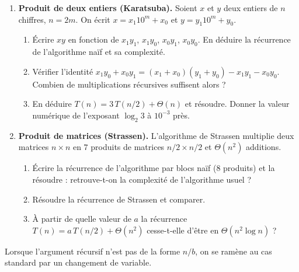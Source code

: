 \documentclass[11pt,a4paper]{article}
\begin{document}
\begin{enumerate}[label=\arabic*.,leftmargin=*]
  \item \textbf{Produit de deux entiers (Karatsuba).} Soient $x$ et $y$ deux entiers de
        $n$ chiffres, $n=2m$. On écrit $x = x_1 10^{m} + x_0$ et $y = y_1 10^{m}+y_0$.
        \begin{enumerate}[label=(\alph*)]
          \item Écrire $xy$ en fonction de $x_1y_1$, $x_1y_0$, $x_0y_1$, $x_0y_0$.
                En déduire la récurrence de l'algorithme naïf et sa complexité.
          \item Vérifier l'identité
                $x_1y_0 + x_0y_1 = (x_1+x_0)(y_1+y_0) - x_1y_1 - x_0y_0$.
                Combien de multiplications récursives suffisent alors ?
          \item En déduire $T(n) = 3\,T(n/2) + \Theta(n)$ et résoudre. Donner la valeur
                numérique de l'exposant $\log_2 3$ à $10^{-3}$ près.
        \end{enumerate}
  \item \textbf{Produit de matrices (Strassen).} L'algorithme de Strassen multiplie deux
        matrices $n\times n$ en $7$ produits de matrices $n/2 \times n/2$ et
        $\Theta(n^2)$ additions.
        \begin{enumerate}[label=(\alph*)]
          \item Écrire la récurrence de l'algorithme par blocs naïf ($8$ produits) et
                la résoudre : retrouve-t-on la complexité de l'algorithme usuel ?
          \item Résoudre la récurrence de Strassen et comparer.
          \item À partir de quelle valeur de $a$ la récurrence $T(n)=a\,T(n/2)+\Theta(n^2)$
                cesse-t-elle d'être en $\Theta(n^2\log n)$ ?
        \end{enumerate}
\end{enumerate}

Lorsque l'argument récursif n'est pas de la forme $n/b$, on se ramène au cas standard
par un changement de variable.
\end{document}
